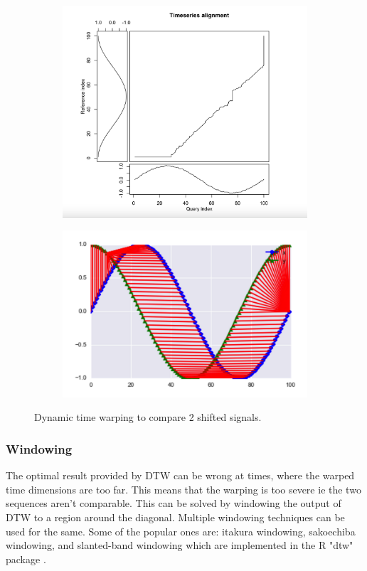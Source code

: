 \documentclass[hidelinks,BTech]{iitmdiss}
\begin{document}
\begin{figure}[H]
  \centering
  \begin{subfigure}[t]{0.7\textwidth}
    \centering
      \includegraphics[width=\textwidth]{DTW.png}
  \end{subfigure}
  \quad
  \begin{subfigure}[t]{0.7\textwidth}
    \centering
      \includegraphics[width=\textwidth]{DTW2.png}
  \end{subfigure}
  \caption{Dynamic time warping to compare 2 shifted signals.}
\end{figure}

\subsubsection{Windowing}
The optimal result provided by DTW can be wrong at times, where the warped time dimensions are too far. This means that the warping is too severe ie the two sequences aren't comparable. This can be solved by windowing the output of DTW to a region around the diagonal. Multiple windowing techniques can be used for the same. Some of the popular ones are: itakura windowing, sakoechiba windowing, and slanted-band windowing which are implemented in the R "dtw" package \cite{RDTWPackage}. 
\end{document}
